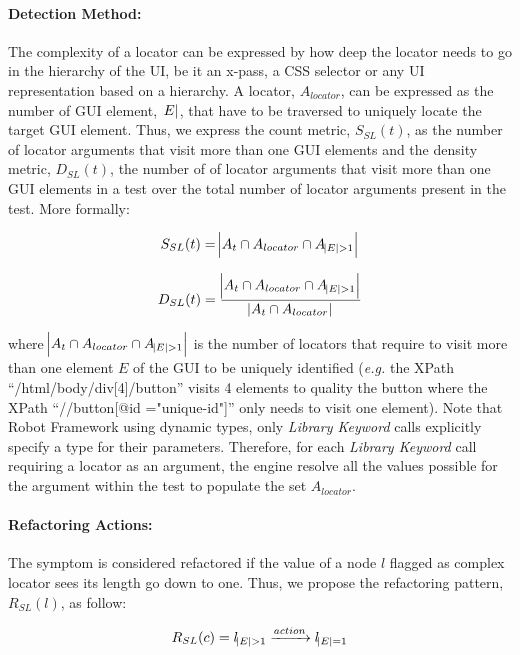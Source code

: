 \paragraph{Detection Method:}

The complexity of a locator can be expressed by how deep the locator needs to go in the hierarchy of the UI, be it an x-pass, a CSS selector or any UI representation based on a hierarchy. A locator, $A_{locator}$, can be expressed as the number of GUI element, $\abs{E}$, that have to be traversed to uniquely locate the target GUI element. Thus, we express the count metric, $S_{SL}(t)$, as the number of locator arguments that visit more than one GUI elements and the density metric, $D_{SL}(t)$, the number of of locator arguments that visit more than one GUI elements in a test over the total number of locator arguments present in the test. More formally:

\begin{equation*}
    S_{SL}(t) = \abs{A_t \cap A_{locator} \cap A_{\abs{E} > 1}}
\end{equation*}

\begin{equation*}
    D_{SL}(t) = \frac{\abs{A_t \cap A_{locator} \cap A_{\abs{E} > 1}}}{\abs{A_t \cap A_{locator}}}
\end{equation*}

where $\abs{A_t \cap A_{locator} \cap A_{\abs{E} > 1}}$ is the number of locators that require to visit more than one element $E$ of the GUI to be uniquely identified (\emph{e.g.} the XPath ``/html/body/div[4]/button'' visits 4 elements to quality the button where the XPath ``//button[@id ="unique-id"]'' only needs to visit one element). Note that Robot Framework using dynamic types, only \emph{Library Keyword} calls explicitly specify a type for their parameters. Therefore, for each \emph{Library Keyword} call requiring a locator as an argument, the engine resolve all the values possible for the argument within the test to populate the set $A_{locator}$.

\paragraph{Refactoring Actions:}

The symptom is considered refactored if the value of a node $l$ flagged as complex locator sees its length go down to one. Thus, we propose the refactoring pattern, $R_{SL}(l)$, as follow:

\begin{equation*}
    R_{SL}(c) = l_{\abs{E} > 1} \xrightarrow{action} l_{\abs{E} = 1}
\end{equation*}

